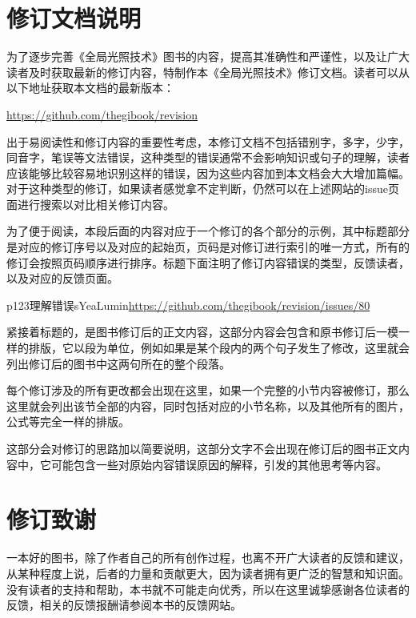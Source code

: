 \chapter*{修订文档说明}
为了逐步完善《全局光照技术》图书的内容，提高其准确性和严谨性，以及让广大读者及时获取最新的修订内容，特制作本《全局光照技术》修订文档。读者可以从以下地址获取本文档的最新版本：

\url{https://github.com/thegibook/revision}

出于易阅读性和修订内容的重要性考虑，本修订文档不包括错别字，多字，少字，同音字，笔误等文法错误，这种类型的错误通常不会影响知识或句子的理解，读者应该能够比较容易地识别这样的错误，因为这些内容加到本文档会大大增加篇幅。对于这种类型的修订，如果读者感觉拿不定判断，仍然可以在上述网站的issue页面进行搜索以对比相关修订内容。

为了便于阅读，本段后面的内容对应于一个修订的各个部分的示例，其中标题部分是对应的修订序号以及对应的起始页，页码是对修订进行索引的唯一方式，所有的修订会按照页码顺序进行排序。标题下面注明了修订内容错误的类型，反馈读者，以及对应的反馈页面。

\begin{revision}{p123}{理解错误}{sYeaLumin}{\url{https://github.com/thegibook/revision/issues/80}}	
\end{revision}

紧接着标题的，是图书修订后的正文内容，这部分内容会包含和原书修订后一模一样的排版，它以段为单位，例如如果是某个段内的两个句子发生了修改，这里就会列出修订后的图书中这两句所在的整个段落。

每个修订涉及的所有更改都会出现在这里，如果一个完整的小节内容被修订，那么这里就会列出该节全部的内容，同时包括对应的小节名称，以及其他所有的图片，公式等完全一样的排版。

\begin{myshaded}
	这部分会对修订的思路加以简要说明，这部分文字不会出现在修订后的图书正文内容中，它可能包含一些对原始内容错误原因的解释，引发的其他思考等内容。
\end{myshaded}




\chapter*{修订致谢}
一本好的图书，除了作者自己的所有创作过程，也离不开广大读者的反馈和建议，从某种程度上说，后者的力量和贡献更大，因为读者拥有更广泛的智慧和知识面。没有读者的支持和帮助，本书就不可能走向优秀，所以在这里诚挚感谢各位读者的反馈，相关的反馈报酬请参阅本书的反馈网站。


